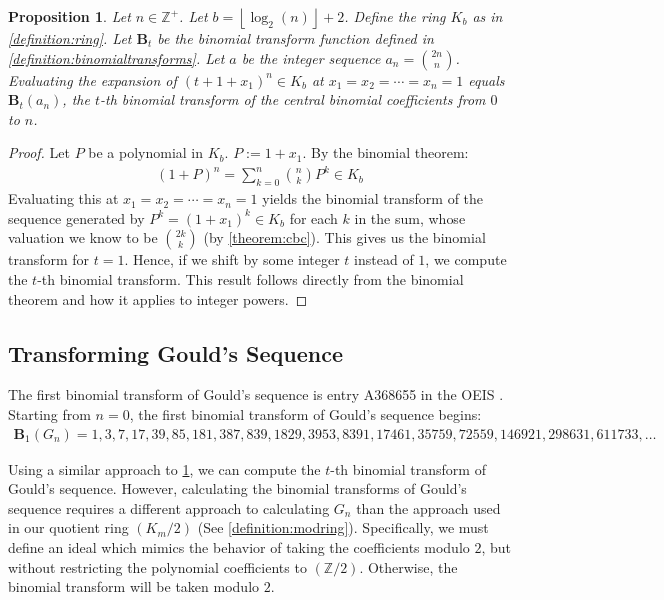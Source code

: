\documentclass{article}
\theoremstyle{plain}
\theoremstyle{definition}
\newtheorem{proposition}{Proposition}
\newcommand{\floor}[1]{\left\lfloor #1 \right\rfloor}
\newcommand{\Z}{\mathbb{Z}}
\newcommand{\K}{K}
\newcommand{\BT}{\textbf{B}}
\begin{document}
\begin{proposition} \label{proposition:binomialtransforms}
\textit{
Let $n \in \Z^+$. Let $b={\floor{\log_2(n)}+2}$. Define the ring $\K_b$ as in \cref{definition:ring}. Let $\BT_t$ be the binomial transform function defined in \cref{definition:binomialtransforms}. Let $a$ be the integer sequence $a_n=\binom{2n}{n}$. Evaluating the expansion of $(t + 1 + x_1)^n \in \K_b$ at $x_1=x_2=\cdots=x_n=1$ equals $\BT_t(a_n)$, the $t$-th binomial transform of the central binomial coefficients from $0$ to $n$.
}
\end{proposition}
\begin{proof}
Let $P$ be a polynomial in $\K_b$. $P := 1 + x_1$. By the binomial theorem:
\begin{align*}
(1 + P)^n = \sum_{k=0}^{n} \binom{n}{k} P^k \in \K_b
\end{align*}
Evaluating this at $x_1=x_2=\cdots=x_n=1$ yields the binomial transform of the sequence generated by $P^k = (1 + x_1)^k \in \K_b$ for each $k$ in the sum, whose valuation we know to be $\binom{2k}{k}$ (by \cref{theorem:cbc}). This gives us the binomial transform for $t=1$. Hence, if we shift by some integer $t$ instead of $1$, we compute the $t$-th binomial transform. This result follows directly from the binomial theorem and how it applies to integer powers.
\end{proof}

\subsection{Transforming Gould's Sequence}
The first binomial transform of Gould's sequence is entry A368655 in the OEIS \cite{A368655}. Starting from $n=0$, the first binomial transform of Gould's sequence begins:
\begin{align*}
\BT_{1}(G_n) = 1, 3, 7, 17, 39, 85, 181, 387, 839, 1829, 3953, 8391, 17461, 35759, 72559, 146921, 298631, 611733, \ldots
\end{align*}

Using a similar approach to \cref{proposition:binomialtransforms}, we can compute the $t$-th binomial transform of Gould's sequence. However, calculating the binomial transforms of Gould's sequence requires a different approach to calculating $G_n$ than the approach used in our quotient ring $(K_m/2)$ (See \cref{definition:modring}). Specifically, we must define an ideal which mimics the behavior of taking the coefficients modulo $2$, but without restricting the polynomial coefficients to $(\Z/2)$. Otherwise, the binomial transform will be taken modulo $2$.
\end{document}
